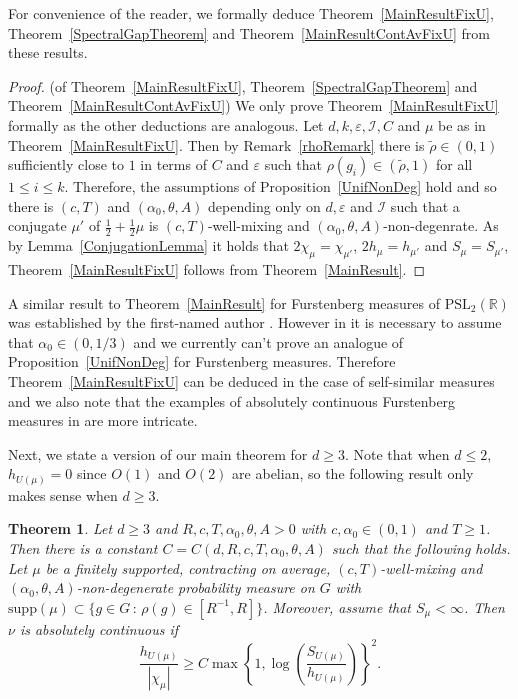 \documentclass[10pt, english,oneside,reqno]{amsart}
\theoremstyle{plain}
\newtheorem{theorem}{Theorem}[section]
\theoremstyle{remark}
\numberwithin{equation}{section}
\numberwithin{figure}{section}
\newcommand{\eps}{\varepsilon}
\newcommand{\R}{\mathbb{R}}
\begin{document}
    For convenience of the reader, we formally deduce Theorem~\ref{MainResultFixU}, Theorem~\ref{SpectralGapTheorem} and Theorem~\ref{MainResultContAvFixU} from these results.

    \begin{proof}(of Theorem~\ref{MainResultFixU}, Theorem~\ref{SpectralGapTheorem} and Theorem~\ref{MainResultContAvFixU})
       We only prove Theorem~\ref{MainResultFixU} formally as the other deductions are analogous. Let $d,k,\eps, \mathcal{I},C$ and $\mu$ be as in Theorem~\ref{MainResultFixU}. Then by Remark~\ref{rhoRemark} there is $\tilde{\rho} \in (0,1)$ sufficiently close to $1$ in terms of $C$ and $\eps$ such that $\rho(g_i) \in (\tilde{\rho},1)$ for all $1\leq i \leq k$. Therefore, the assumptions of Proposition~\ref{UnifNonDeg} hold and so there is $(c,T)$ and $(\alpha_0,\theta, A)$ depending only on $d, \eps$ and $\mathcal{I}$ such that a conjugate $\mu'$ of $\frac{1}{2} + \frac{1}{2}\mu$ is $(c,T)$-well-mixing and $(\alpha_0,\theta, A)$-non-degenrate. As by Lemma~\ref{ConjugationLemma} it holds that $2\chi_{\mu} = \chi_{\mu'}$, $2h_{\mu} = h_{\mu'}$ and $S_{\mu} = S_{\mu'}$, Theorem~\ref{MainResultFixU} follows from Theorem~\ref{MainResult}.
    \end{proof}

    A similar result to Theorem~\ref{MainResult} for Furstenberg measures of $\mathrm{PSL}_2(\R)$ was established by the first-named author \cite{Kittle2023}. However in \cite{Kittle2023} it is necessary to assume that $\alpha_0 \in (0,1/3)$ and we currently can't prove an analogue of Proposition~\ref{UnifNonDeg} for Furstenberg measures. Therefore Theorem~\ref{MainResultFixU} can be deduced in the case of self-similar measures and we also note that the examples of absolutely continuous Furstenberg measures in \cite{Kittle2023} are more intricate.

    Next, we state a version of our main theorem for $d\geq 3$. Note that when $d\leq 2$, $h_{U(\mu)} = 0$ since $O(1)$ and $O(2)$ are abelian, so the following result only makes sense when $d \geq 3$. 

    \begin{theorem}\label{HighdimMainTheorem} Let $d \geq 3$ and $R, c, T, \alpha_0, \theta, A > 0$ with $c, \alpha_0 \in (0,1)$ and $T \geq 1$. Then there is a constant $C = C(d,R, c, T, \alpha_0, \theta,A)$ such that the following holds. Let $\mu$ be a finitely supported, contracting on average, $(c,T)$-well-mixing and $(\alpha_0 , \theta,A)$-non-degenerate probability measure on $G$ with $\mathrm{supp}(\mu) \subset \{ g \in G \,:\, \rho(g) \in [R^{-1},R] \}$. Moreover, assume that $S_{\mu} < \infty$. Then $\nu$ is absolutely continuous if $$\frac{h_{U(\mu)}}{|\chi_{\mu}|} \geq C \max\left\{ 1, \log \left( \frac{ S_{U(\mu)}}{h_{U(\mu)}} \right)  \right\}^2. $$    
    \end{theorem}
\end{document}
